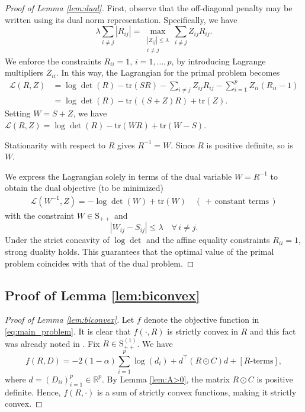 \documentclass[12pt]{amsart}
\numberwithin{equation}{section}
\numberwithin{equation}{section}
\theoremstyle{plain}
\theoremstyle{definition}
\newcommand{\tr}{\mathrm{tr}}
\newcommand{\Spp}{\mathrm{S}_{++}}
\newcommand{\Sppone}{\mathrm{S}_{++}^{(1)}}
\newcommand{\R}{\mathbb{R}}
\begin{document}
\begin{proof}[Proof of Lemma \ref{lem:dual}]
First, observe that the off-diagonal penalty may be written using its dual norm representation. Specifically, we have
\[
\lambda \sum_{i\neq j}|R_{ij}| = \max_{\substack{|Z_{ij}|\leq \lambda\\ i\neq j}} \sum_{i\neq j} Z_{ij} R_{ij}.
\]
We enforce the constraints $R_{ii}=1$, $i=1,\ldots,p$, by introducing Lagrange multipliers $Z_{ii}$. In this way, the Lagrangian for the primal problem becomes 
\begin{align*}
\mathcal{L}(R, Z) &= \log\det(R) - \tr(S R) - \sum_{i\neq j} Z_{ij} R_{ij} - \sum_{i=1}^p Z_{ii}(R_{ii}-1) \\
&= \log\det(R)-\tr((S+Z)R) + \tr(Z).
\end{align*}
Setting $W=S+Z$, we have $\mathcal{L}(R, Z) = \log\det(R)-\tr(WR)+\tr(W-S)$. 

Stationarity with respect to $R$ gives 
$R^{-1} = W$.
Since $R$ is positive definite, so is $W$.

We express the Lagrangian solely in terms of the dual variable $W=R^{-1}$ to obtain the dual objective (to be minimized)
\begin{align*}
\mathcal{L}(W^{-1}, Z) = -\log\det(W) + \tr(W) \quad (\,+\,\mbox{constant terms}\,)
\end{align*}
with the constraint $W\in\Spp$ and
\[
|W_{ij}-S_{ij}|\leq \lambda\quad\forall\, i\neq j.
\]
Under the strict concavity of $\log\det$ and the affine equality constraints $R_{ii}=1$, strong duality holds. This guarantees that the optimal value of the primal problem coincides with that of the dual problem.
\end{proof}

\subsection{Proof of Lemma \ref{lem:biconvex}}
\begin{proof}[Proof of Lemma \ref{lem:biconvex}]
Let $f$ denote the objective function in \eqref{eq:main_problem}. It is clear that $f(\cdot,R)$ is strictly convex in $R$ and this fact was already noted in \cite[Proposition 4]{Carter}. Fix $R\in\Sppone$. We have 
\[
f(R,D) = -2(1-\alpha)\sum_{i=1}^p \log(d_{i}) + d^\top (R\odot C) d + [R\mbox{-terms}], 
\]
where $d=(D_{ii})_{i=1}^p \in\R^p$. 
By Lemma \ref{lem:A>0}, the matrix $R\odot C$ is positive definite. Hence, $f(R,\cdot)$ is a sum of strictly convex functions, making it strictly convex.
\end{proof}
\end{document}
